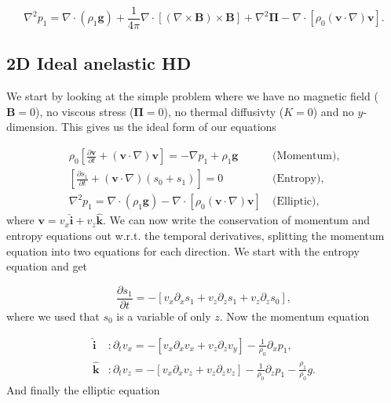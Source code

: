 \begin{equation}\label{eq:elliptic}
    \nabla^2 p_1 = \nabla\cdot(\rho_1\mathbf{g}) + \frac{1}{4\pi}\nabla\cdot\left[(\nabla\times\mathbf{B})\times\mathbf{B} \right]+\nabla^2\mathbf{\Pi}-\nabla\cdot\left[\rho_0(\mathbf{v}\cdot\nabla)\mathbf{v}\right].
\end{equation}

\subsection{2D Ideal anelastic HD}
We start by looking at the simple problem where we have no magnetic field ($\mathbf{B}=0$), no viscous stress ($\mathbf{\Pi}=0$), no thermal diffusivty ($K=0$) and no $y$-dimension. This gives us the ideal form of our equations

\begin{align}
    \rho_0\left[\frac{\partial\mathbf{v}}{\partial t}+(\mathbf{v}\cdot\nabla)\mathbf{v}\right]=-\nabla p_1 + \rho_1\mathbf{g}\ &\text{(Momentum)},\\
    \left[\frac{\partial s_1}{\partial t} + (\mathbf{v}\cdot \nabla)(s_0+s_1) \right]
    = 0\ &\text{(Entropy)},\\
    \nabla^2 p_1 = \nabla\cdot(\rho_1\mathbf{g})-\nabla\cdot\left[\rho_0(\mathbf{v}\cdot\nabla)\mathbf{v}\right]\ &\text{(Elliptic)},
\end{align}
where $\mathbf{v}=v_x\mathbf{\hat{i}}+v_z\mathbf{\hat{k}}$. We can now write the conservation of momentum and entropy equations out w.r.t. the temporal derivatives, splitting the momentum equation into two equations for each direction. We start with the entropy equation and get

\begin{equation}\label{eq:ideal_entropy_wrt_t}
    \frac{\partial s_1}{\partial t} = - \left[ v_x \partial_x s_1 + v_z \partial_z s_1 + v_z\partial_z s_0 \right],
\end{equation}
where we used that $s_0$ is a variable of only $z$. Now the momentum equation

\begin{align}
    \mathbf{\hat{i}} &: \partial_t v_x = - \left[ v_x\partial_x v_x + v_z\partial_z v_y \right] - \frac{1}{\rho_0} \partial_x p_1,\\
    \mathbf{\hat{k}} &: \partial_t v_z = - \left[ v_x\partial_x v_z + v_z\partial_z v_z \right] - \frac{1}{\rho_0}\partial_z p_1 - \frac{\rho_1}{\rho_0} g.
\end{align}
And finally the elliptic equation

